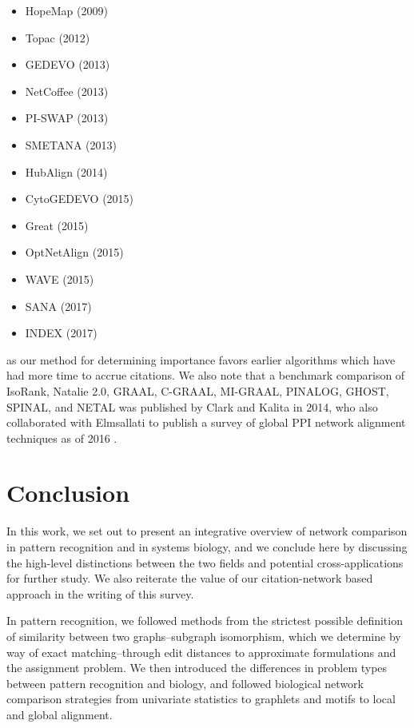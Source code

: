 \documentclass[12pt]{thesis}
\theoremstyle{plain}
\theoremstyle{definition}
\theoremstyle{remark}
\begin{document}
\begin{itemize}
\item HopeMap (2009) \cite{tian2009pairwise}
\item Topac (2012) \cite{guelsoy2012topac}
\item GEDEVO (2013) \cite{ibragimov2013gedevo}
\item NetCoffee (2013) \cite{hu2013netcoffee}
\item PI-SWAP (2013) \cite{chindelevitch2013optimizing}
\item SMETANA (2013) \cite{sahraeian2013smetana}
\item HubAlign (2014) \cite{hashemifar2014hubalign}
\item CytoGEDEVO (2015) \cite{malek2015cytogedevo}
\item Great (2015) \cite{crawford2015great}
\item OptNetAlign (2015) \cite{clark2015multiobjective}
\item WAVE (2015) \cite{sun2015simultaneous}
\item SANA (2017) \cite{mamano2017SANA}
\item INDEX (2017) \cite{mir2017index}
\end{itemize}
as our method for determining importance favors earlier algorithms which have had more time to accrue citations. We also note that a benchmark comparison of IsoRank, Natalie 2.0, GRAAL, C-GRAAL, MI-GRAAL, PINALOG, GHOST, SPINAL, and NETAL was published by Clark and Kalita \cite{clark2014comparison} in 2014, who also collaborated with Elmsallati to publish a survey of global PPI network alignment techniques as of 2016 \cite{elmsallati2016global}.





\chapter{Conclusion}

In this work, we set out to present an integrative overview of network comparison in pattern recognition and in systems biology, and we conclude here by discussing the high-level distinctions between the two fields and potential cross-applications for further study. We also reiterate the value of our citation-network based approach in the writing of this survey.

In pattern recognition, we followed methods from the strictest possible definition of similarity between two graphs--subgraph isomorphism, which we determine by way of exact matching--through edit distances to approximate formulations and the assignment problem. We then introduced the differences in problem types between pattern recognition and biology, and followed biological network comparison strategies from univariate statistics to graphlets and motifs to local and global alignment.
\end{document}
